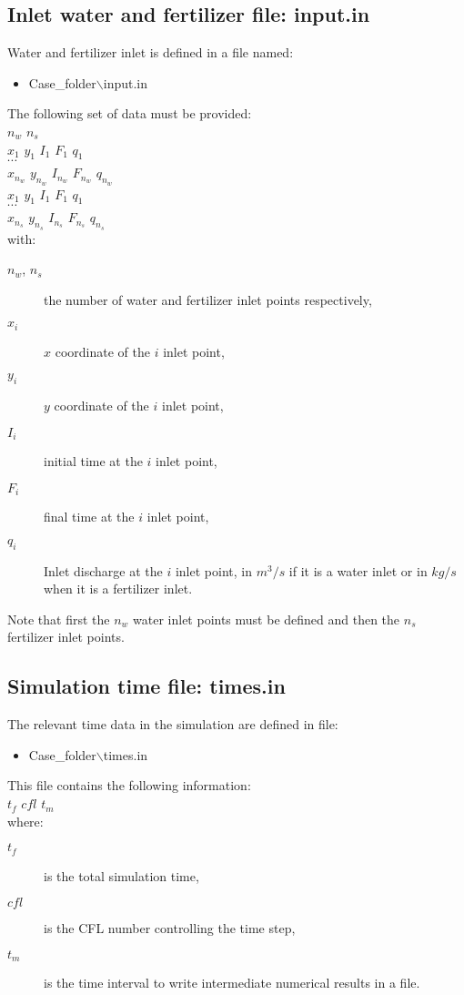 \subsection{Inlet water and fertilizer file: input.in}

Water and fertilizer inlet is defined in a file named:
\begin{itemize}
\item Case\_folder$\backslash$input.in
\end{itemize}

The following set of data must be provided:\\
$n_w$ $n_s$\\
$x_1$ $y_1$ $I_1$ $F_1$ $q_1$\\
$\cdots$\\
$x_{n_w}$ $y_{n_w}$ $I_{n_w}$ $F_{n_w}$ $q_{n_w}$\\
$x_1$ $y_1$ $I_1$ $F_1$ $q_1$\\
$\cdots$\\
$x_{n_s}$ $y_{n_s}$ $I_{n_s}$ $F_{n_s}$ $q_{n_s}$\\
with:
\begin{description}
\item[$n_w$, $n_s$] the number of water and fertilizer inlet points respectively,
\item[$x_i$] $x$ coordinate of the $i$ inlet point,
\item[$y_i$] $y$ coordinate of the $i$ inlet point,
\item[$I_i$] initial time at the $i$ inlet point,
\item[$F_i$] final time at the $i$ inlet point,
\item[$q_i$] Inlet discharge at the $i$ inlet point, in $m^3/s$ if it is a water inlet or in 
	 $kg/s$ when it is a fertilizer inlet.
\end{description}
Note that first the $n_w$ water inlet points must be defined and then the $n_s$ fertilizer inlet points.

\subsection{Simulation time file: times.in\label{SecTiempos}}

The relevant time data in the simulation are defined in file:
\begin{itemize}
\item Case\_folder$\backslash$times.in
\end{itemize}

This file contains the following information:\\
$t_f$ $cfl$ $t_m$\\
where:
\begin{description}
\item[$t_f$] is the total simulation time,
\item[$cfl$] is the CFL number controlling the time step,
\item[$t_m$] is the time interval to write intermediate numerical results in a file.
\end{description}

